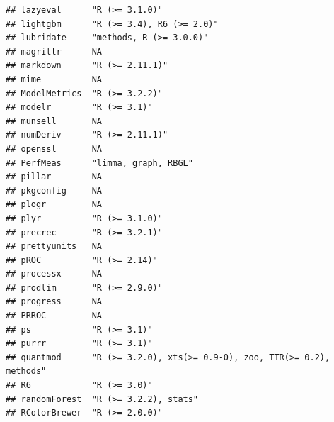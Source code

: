 \documentclass[]{article}
\begin{document}
\begin{verbatim}
## lazyeval      "R (>= 3.1.0)"                                                           
## lightgbm      "R (>= 3.4), R6 (>= 2.0)"                                                
## lubridate     "methods, R (>= 3.0.0)"                                                  
## magrittr      NA                                                                       
## markdown      "R (>= 2.11.1)"                                                          
## mime          NA                                                                       
## ModelMetrics  "R (>= 3.2.2)"                                                           
## modelr        "R (>= 3.1)"                                                             
## munsell       NA                                                                       
## numDeriv      "R (>= 2.11.1)"                                                          
## openssl       NA                                                                       
## PerfMeas      "limma, graph, RBGL"                                                     
## pillar        NA                                                                       
## pkgconfig     NA                                                                       
## plogr         NA                                                                       
## plyr          "R (>= 3.1.0)"                                                           
## precrec       "R (>= 3.2.1)"                                                           
## prettyunits   NA                                                                       
## pROC          "R (>= 2.14)"                                                            
## processx      NA                                                                       
## prodlim       "R (>= 2.9.0)"                                                           
## progress      NA                                                                       
## PRROC         NA                                                                       
## ps            "R (>= 3.1)"                                                             
## purrr         "R (>= 3.1)"                                                             
## quantmod      "R (>= 3.2.0), xts(>= 0.9-0), zoo, TTR(>= 0.2), methods"                 
## R6            "R (>= 3.0)"                                                             
## randomForest  "R (>= 3.2.2), stats"                                                    
## RColorBrewer  "R (>= 2.0.0)"                                                           

\end{verbatim}
\end{document}
